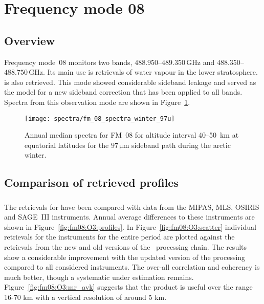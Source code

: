 \section{Frequency mode 08}
\label{sec:fm08}

\subsection{Overview}
\label{sec:fm08:overview}
Frequency mode~08 monitors two bands, $488.950$--$489.350\,\mathrm{GHz}$ and
$488.350$--$488.750\,\mathrm{GHz}$. Its main use is retrievals of water vapour in the lower stratosphere.  is also retrieved.
This mode showed considerable sideband leakage and served as the model for a new sideband correction that has been applied to all bands.
Spectra from this observation mode are shown in Figure~\ref{fig:spectra:08}.

\begin{figure}[ht]
    \texttt{[image: spectra/fm\_08\_spectra\_winter\_97u]}
    \caption{Annual median spectra for FM~08 for altitude interval 40--50~km at
        equatorial latitudes for the $97\,\mathrm{\mu m}$ sideband path during
        the arctic winter.
    }\label{fig:spectra:08}
\end{figure}


\subsection{Comparison of retrieved profiles}
\label{sec:fm08:comparison}



\subsubsection{}
\label{sec:fm08:comparison:O3}
The retrievals for  have been compared with data from the MIPAS, MLS,
OSIRIS and SAGE~III instruments. Annual average differences to these
instruments are shown in Figure~\ref{fig:fm08:O3:profiles}. In
Figure~\ref{fig:fm08:O3:scatter} individual retrievals for the instruments for
the entire period are plotted against the retrievals from the new and old
versions of the \smr\ processing chain. The results show a considerable
improvement with the updated version of the processing compared to all
considered instruments. The over-all correlation and coherency is much better,
though a systematic under estimation remains.
Figure~\ref{fig:fm08:O3:mr_avk} suggests that the product is useful over the range 16-70 km with a vertical resolution of around 5 km.


